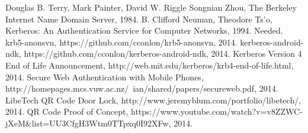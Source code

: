 \documentclass[]{report}   %
\begin{document}
\begin{thebibliography}{9}
 Douglas B. Terry, Mark Painter, David W. Riggle Songnian Zhou, The Berkeley Internet Name Domain Server, 1984.   
 B. Clifford Neuman, Theodore Ts'o, Kerberos: An Authentication Service for Computer Networks, 1994. 
 Needed.
 krb5-anonsvn, https://github.com/cconlon/krb5-anonsvn, 2014.
 kerberos-android-ndk, https://github.com/cconlon/kerberos-android-ndk, 2014.
 Kerberos Version 4 End of Life Announcement, http://web.mit.edu/kerberos/krb4-end-of-life.html, 2014.
 Secure Web Authentication with Mobile Phones, http://homepages.mcs.vuw.ac.nz/~ian/shared/papers/secureweb.pdf, 2014.
 LibeTech QR Code Door Lock, http://www.jeremyblum.com/portfolio/libetech/, 2014.
 QR Code Proof of Concept, https://www.youtube.com/watch?v=v8ZZWC-jXeM\&list=UU3CfgH3Wtm0TTpxq0I92XFw, 2014.
\end{thebibliography}
\end{document}
